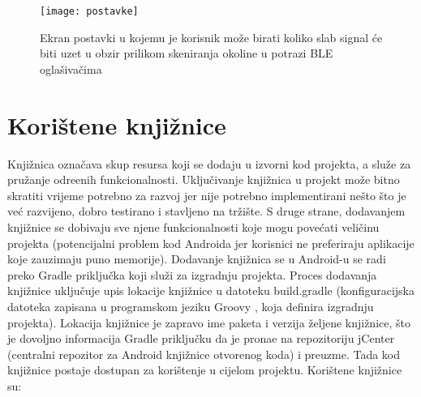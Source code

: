 \begin{figure}[!htbp]
	\begin{center}
 \texttt{[image: postavke]}
 \caption{Ekran postavki u kojemu je korisnik mo\v{z}e birati koliko slab signal \'{c}e biti uzet u obzir prilikom skeniranja okoline u potrazi BLE ogla\v{s}iva\v{c}ima}
 \label{fig:postavke}
	\end{center}
\end{figure}


\section{Kori\v{s}tene knji\v{z}nice}

Knji\v{z}nica ozna\v{c}ava skup resursa koji se dodaju u izvorni kod projekta, a slu\v{z}e za pru\v{z}anje odre\dj enih funkcionalnosti. Uklju\v{c}ivanje knji\v{z}nica u projekt mo\v{z}e bitno skratiti vrijeme potrebno za razvoj jer nije potrebno implementirani ne\v{s}to \v{s}to je ve\'{c} razvijeno, dobro testirano i stavljeno na tr\v{z}i\v{s}te. S druge strane, dodavanjem knji\v{z}nice se dobivaju sve njene funkcionalnosti koje mogu pove\'{c}ati veli\v{c}inu projekta (potencijalni problem kod Androida jer korisnici ne preferiraju aplikacije koje zauzimaju puno memorije).
Dodavanje knji\v{z}nica se u Android-u se radi preko Gradle priklju\v{c}ka \cite{gradle} koji slu\v{z}i za izgradnju projekta. Proces dodavanja knji\v{z}nice uklju\v{c}uje upis lokacije knji\v{z}nice u datoteku build.gradle (konfiguracijska datoteka zapisana u programskom jeziku Groovy \cite{groovy}, koja definira izgradnju projekta). Lokacija knji\v{z}nice je zapravo ime paketa i verzija \v{z}eljene knji\v{z}nice, \v{s}to je dovoljno informacija Gradle priklju\v{c}ku da je prona\dj e na repozitoriju jCenter \cite{jcenter} (centralni repozitor za Android knji\v{z}nice otvorenog koda) i preuzme. Tada kod knji\v{z}nice postaje dostupan za kori\v{s}tenje u cijelom projektu.
Kori\v{s}tene knji\v{z}nice su:

